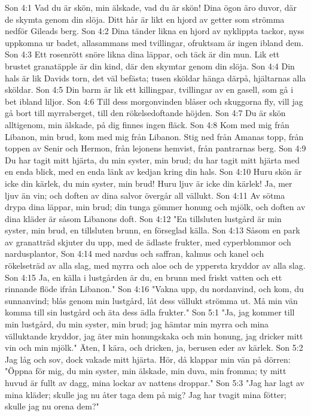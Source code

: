 Son 4:1  Vad du är skön, min älskade, vad du är skön! Dina ögon äro duvor, där de skymta genom din slöja. Ditt hår är likt en hjord av getter som strömma nedför Gileads berg.
Son 4:2  Dina tänder likna en hjord av nyklippta tackor, nyss uppkomna ur badet, allasammans med tvillingar, ofruktsam är ingen ibland dem.
Son 4:3  Ett rosenrött snöre likna dina läppar, och täck är din mun. Lik ett brustet granatäpple är din kind, där den skymtar genom din slöja.
Son 4:4  Din hals är lik Davids torn, det väl befästa; tusen sköldar hänga därpå, hjältarnas alla sköldar.
Son 4:5  Din barm är lik ett killingpar, tvillingar av en gasell, som gå i bet ibland liljor.
Son 4:6  Till dess morgonvinden blåser och skuggorna fly, vill jag gå bort till myrraberget, till den rökelsedoftande höjden.
Son 4:7  Du är skön alltigenom, min älskade, på dig finnes ingen fläck.
Son 4:8  Kom med mig från Libanon, min brud, kom med mig från Libanon. Stig ned från Amanas topp, från toppen av Senir och Hermon, från lejonens hemvist, från pantrarnas berg.
Son 4:9  Du har tagit mitt hjärta, du min syster, min brud; du har tagit mitt hjärta med en enda blick, med en enda länk av kedjan kring din hals.
Son 4:10  Huru skön är icke din kärlek, du min syster, min brud! Huru ljuv är icke din kärlek! Ja, mer ljuv än vin; och doften av dina salvor övergår all vällukt.
Son 4:11  Av sötma drypa dina läppar, min brud; din tunga gömmer honung och mjölk, och doften av dina kläder är såsom Libanons doft.
Son 4:12  "En tillsluten lustgård är min syster, min brud, en tillsluten brunn, en förseglad källa.
Son 4:13  Såsom en park av granatträd skjuter du upp, med de ädlaste frukter, med cyperblommor och nardusplantor,
Son 4:14  med nardus och saffran, kalmus och kanel och rökelseträd av alla slag, med myrra och aloe och de yppersta kryddor av alla slag.
Son 4:15  Ja, en källa i lustgården är du, en brunn med friskt vatten och ett rinnande flöde ifrån Libanon."
Son 4:16  "Vakna upp, du nordanvind, och kom, du sunnanvind; blås genom min lustgård, låt dess vällukt strömma ut. Må min vän komma till sin lustgård och äta dess ädla frukter."
Son 5:1  "Ja, jag kommer till min lustgård, du min syster, min brud; jag hämtar min myrra och mina välluktande kryddor, jag äter min honungskaka och min honung, jag dricker mitt vin och min mjölk." Äten, I kära, och dricken, ja, berusen eder av kärlek.
Son 5:2  Jag låg och sov, dock vakade mitt hjärta. Hör, då klappar min vän på dörren: "Öppna för mig, du min syster, min älskade, min duva, min fromma; ty mitt huvud är fullt av dagg, mina lockar av nattens droppar."
Son 5:3  "Jag har lagt av mina kläder; skulle jag nu åter taga dem på mig? Jag har tvagit mina fötter; skulle jag nu orena dem?"
